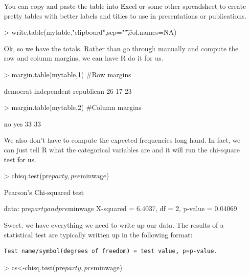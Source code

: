 \documentclass[12pt]{article}
\begin{document}
You can copy and paste the table into Excel or some other spreadsheet to 
create pretty tables with better labels and titles to use in presentations
or publications.

\begin{Schunk}
\begin{Sinput}
> write.table(mytable,"clipboard",sep="\t",col.names=NA)
\end{Sinput}
\end{Schunk}

Ok, so we have the totals. Rather than go through manually and compute the row
and column margins, we can have R do it for us.

\begin{Schunk}
\begin{Sinput}
> margin.table(mytable,1) #Row margins
\end{Sinput}
\begin{Soutput}
   democrat independent  republican 
         26          17          23 
\end{Soutput}
\begin{Sinput}
> margin.table(mytable,2) #Column margins
\end{Sinput}
\begin{Soutput}
 no yes 
 33  33 
\end{Soutput}
\end{Schunk}

We also don't have to compute the expected frequencies long hand. In fact, we
can just tell R what the categorical variables are and it will run the chi-square
test for us.

\begin{Schunk}
\begin{Sinput}
> chisq.test(pre$party,pre$minwage)
\end{Sinput}
\begin{Soutput}
	Pearson's Chi-squared test

data:  pre$party and pre$minwage
X-squared = 6.4037, df = 2, p-value = 0.04069
\end{Soutput}
\end{Schunk}

Sweet. we have everything we need to write up our data. The results of a statistical
test are typically written up in the following format:
\begin{verbatim}
Test name/symbol(degrees of freedom) = test value, p=p-value.
\end{verbatim}

\begin{Schunk}
\begin{Sinput}
> cs<-chisq.test(pre$party,pre$minwage)
\end{Sinput}
\end{Schunk}
\end{document}
